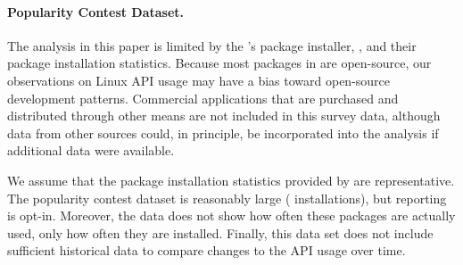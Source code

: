 \paragraph{Popularity Contest Dataset.}
The analysis in this paper is limited
by the \osdist{}'s package installer, \osinstaller{},
and their package installation statistics.
Because most packages in \osdist{} are open-source,
our observations on Linux API usage may have a bias toward open-source development patterns.
Commercial applications that are purchased and distributed
through other means are not included in this survey data,
although data from other sources could, in principle, be incorporated
into the analysis if additional data were available.

We assume that the package installation statistics provided by \osdist{} are representative.
The popularity contest dataset is reasonably large (\popsamples{} installations),
but reporting is opt-in.
Moreover,
the data does not show how often these packages
are actually used, only how often they are installed.
Finally, this data set does not include sufficient historical data
to compare changes to the API usage over time.







